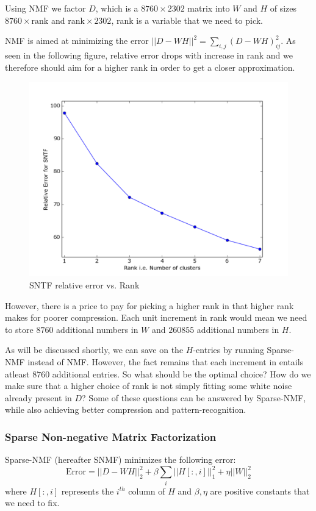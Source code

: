 \documentclass[10pt,a4paper]{amsart}
\begin{document}
Using NMF we factor \(D\), which is a \(8760\times 2302\) matrix into \(W\)
and \(H\) of sizes \(8760\times\text{rank}\) and \(\text{rank}\times 2302\),
rank is a variable that we need to pick.

NMF is aimed at minimizing the error \(||D-WH||^2 = \sum_{i,j}(D-WH)_{ij}^2\).
As seen in the following figure, relative error drops with increase in rank
and we therefore should aim for a higher rank in order to get a closer
approximation.

\begin{figure}[hbtp]
\centering
\includegraphics[scale=0.5]{Figures/SNTF_Error_vs_Rank.pdf}
\caption{SNTF relative error vs. Rank}
\end{figure}

However, there is a price to pay for picking a higher rank in that higher rank
makes for poorer compression. Each unit increment in rank would mean we need
to store \(8760\) additional numbers in \(W\) and \(260855\) additional
numbers in \(H\).

As will be discussed shortly, we can save on the \(H\)-entries by running
Sparse-NMF instead of NMF. However, the fact remains that each increment in
entails atleast \(8760\) additional entries. So what should be the optimal
choice? How do we make sure that a higher choice of rank is not simply fitting
some white noise already present in \(D\)? Some of these questions can be
answered by Sparse-NMF, while also achieving better compression and
pattern-recognition.

\subsubsection{Sparse Non-negative Matrix Factorization}
Sparse-NMF (hereafter SNMF) minimizes the following error:
	\[\text{Error} = ||D-WH||_2^2 + \beta\sum_i||H[:,i]||_1^2 + \eta||W||_2^2\]
where \(H[:,i]\) represents the \(i^{th}\) column of \(H\) and \(\beta,\eta\)
are positive constants that we need to fix.
\end{document}
